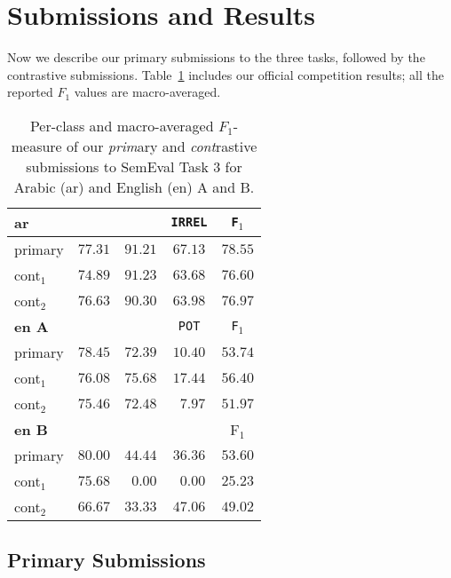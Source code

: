 \section{Submissions and Results}
\label{sec:experiments}

Now we describe our primary submissions to the three tasks, followed by the 
contrastive submissions. Table~\ref{tab:results} includes our official 
competition results; all the reported $F_1$ values are macro-averaged.



\begin{table}%
\centering
\footnotesize
\begin{tabular}{|l|cccc|}
  \hline
  \bf ar	& \dir & \rel & \texttt{IRREL} & \texttt{F$_1$}\\  \hline  
  primary	& $77.31$ & $91.21$	& $67.13$	& $78.55$ \\
  cont$_1$	& $74.89$ & $91.23$	& $63.68$	& $76.60$ \\
  cont$_2$	& $76.63$ & $90.30$	& $63.98$	& $76.97$ \\
  \hline \hline

  \bf en A	& \good   & \bad 	& \texttt{POT}	& \texttt{F$_1$}\\\hline
  primary	& $78.45$ & $72.39$	& $10.40$	& $53.74$ \\
  cont$_1$ 	& $76.08$ & $75.68$	& $17.44$	& $56.40$ \\
  cont$_2$ 	& $75.46$ & $72.48$ 	& $\,\,\,7.97$	& $51.97$ \\
\hline  \hline

\bf en B	& \yes	  & \no		& \unsure	& F$_1$	 \\
  \hline  
  primary	& $80.00$ & $44.44$	& $36.36$	& $53.60$ \\
  cont$_1$ 	& $75.68$ & $\,\,\,0.00$& $\,\,\,0.00$	& $25.23$ \\
  cont$_2$ 	& $66.67$ & $33.33$ 	& $47.06$	& $49.02$ \\
  \hline
 \end{tabular}
\caption{Per-class and macro-averaged $F_1$-measure of our \textit{prim}ary and 
\textit{cont}rastive submissions to SemEval Task 3 for Arabic (ar) and English 
(en) A and B.
\label{tab:results}}
\end{table}

\subsection{Primary Submissions}

